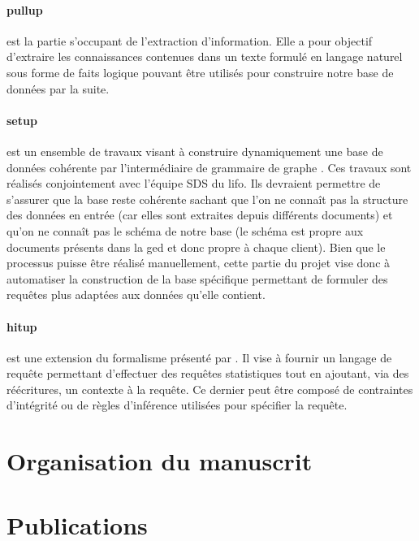 \paragraph{\gls{pullup}} est la partie s'occupant de l'extraction d'information.
Elle a pour objectif d'extraire les connaissances contenues dans un texte formulé en langage naturel sous forme de faits logique pouvant être utilisés pour construire notre base de données par la suite.

\paragraph{\gls{setup}} est un ensemble de travaux visant à construire dynamiquement une base de données cohérente par l'intermédiaire de grammaire de graphe \cite{chabin_using_2019}.
Ces travaux sont réalisés conjointement avec l'équipe SDS du \gls{lifo}.
Ils devraient permettre de s'assurer que la base reste cohérente sachant que l'on ne connaît pas la structure des données en entrée (car elles sont extraites depuis différents documents) et qu'on ne connaît pas le schéma de notre base (le schéma est propre aux documents présents dans la \gls{ged} et donc propre à chaque client).
Bien que le processus puisse être réalisé manuellement, cette partie du projet vise donc à automatiser la construction de la base spécifique permettant de formuler des requêtes plus adaptées aux données qu'elle contient.

\paragraph{\gls{hitup}} est une extension du formalisme présenté par \cite{chabin_context-driven_2018}.
Il vise à fournir un langage de requête permettant d'effectuer des requêtes statistiques tout en ajoutant, via des réécritures, un contexte à la requête.
Ce dernier peut être composé de contraintes d'intégrité ou de règles d'inférence utilisées pour spécifier la requête.

\section{Organisation du manuscrit}

\section{Publications}
